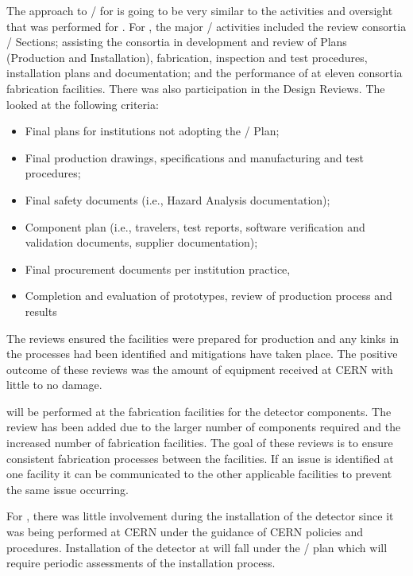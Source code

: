 The approach to / for  is going to be very
similar to the activities and oversight that was performed for
.  For , the major /
activities included the review consortia  /
Sections; assisting the consortia in development and review of 
Plans (Production and Installation), fabrication, inspection and test
procedures, installation plans and documentation; and the performance
of  at eleven consortia fabrication facilities.  There was
also  participation in the  Design Reviews.
The  looked at the following criteria:
\begin{itemize}
  \item Final  plans for institutions not adopting the
    /  Plan;
  \item Final production drawings, specifications and manufacturing
    and test procedures;
  \item Final safety documents (i.e., Hazard Analysis documentation);
  \item Component  plan (i.e., travelers, test reports, software
    verification and validation documents, supplier documentation);
  \item Final procurement documents per institution practice,
  \item Completion and evaluation of prototypes, review of production
    process and  results
\end{itemize}
The reviews ensured the facilities were prepared for production and
any kinks in the processes had been identified and mitigations have
taken place. The positive outcome of these reviews was the amount of
equipment received at CERN with little to no damage.

 will be performed at the fabrication facilities for the
 detector components. The review has been added due to the
larger number of components required and the increased number of
fabrication facilities. The goal of these reviews is to ensure
consistent fabrication processes between the facilities. If an issue
is identified at one facility it can be communicated to the other
applicable facilities to prevent the same issue occurring.

For , there was little  
involvement during the installation of the detector since it was being
performed at CERN under the guidance of CERN policies and
procedures. Installation of the  detector at \surf will
fall under the /  plan which will
require periodic assessments of the installation process.

